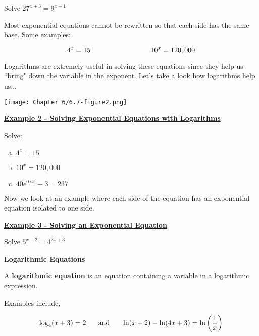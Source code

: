 \documentclass[12pt]{book}
\newcommand{\D}{\displaystyle}
\begin{document}
Solve $\D 27^{x+3}=9^{x-1}$

\vspace{110mm}

Most exponential equations cannot be rewritten so that each side has the same base. Some examples: 

$$ 4^x=15 \hspace{30mm} 10^x = 120,000$$

\vspace{45mm}

Logarithms are extremely useful in solving these equations since they help us ``bring" down the variable in the exponent. Let's take a look how logarithms help us...

\newpage
\centerline{\texttt{[image: Chapter 6/6.7-figure2.png]}}

\underline{\textbf{Example 2 - Solving Exponential Equations with Logarithms}}

Solve: 
\begin{multicols}{3}
    \begin{enumerate}[(a)]
    \item $\D 4^x = 15$
    \item $\D 10^x=120,000$
    \item  $\D 40e^{0.6x} -3 = 237$
\end{enumerate}
\end{multicols}




\newpage
Now we look at an example where each side of the equation has an exponential equation isolated to one side. 
\vspace{5mm}

\underline{\textbf{Example 3 - Solving an Exponential Equation}}
\vspace{1mm}

Solve $\D 5^{x-2}=4^{2x+3}$


\vspace{120mm}






{\large \textbf{Logarithmic Equations}}
\vspace{3mm}

A \textbf{logarithmic equation} is an equation containing a variable in a logarithmic expression. 

Examples include,

$$ \log_4(x+3)=2 \hspace{5mm} \text{ and } \hspace{5mm} \ln(x+2)-\ln(4x+3)= \ln\left(\frac{1}{x}\right)$$
\end{document}
